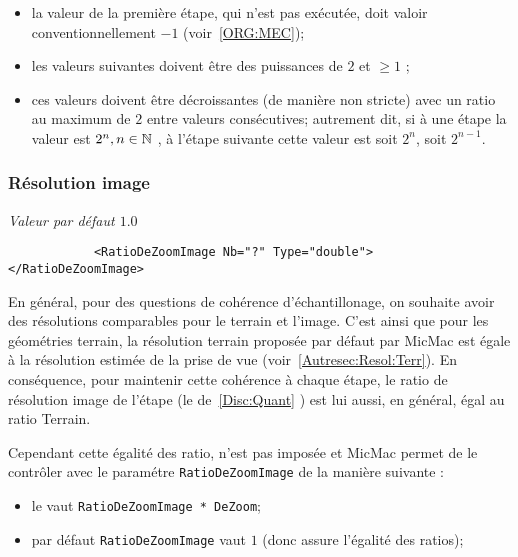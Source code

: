 \begin{itemize}
   \item  la valeur de la premi\`ere \'etape, qui n'est pas ex\'ecut\'ee,
          doit valoir conventionnellement $-1$ (voir~\ref{ORG:MEC});

   \item  les valeurs suivantes doivent \^etre des puissances de $2$
          et $\geq1$ ;

   \item  ces valeurs doivent \^etre d\'ecroissantes (de mani\`ere non
          stricte)  avec un ratio au maximum de $2$ entre valeurs
          cons\'ecutives;
          autrement  dit, si \`a une \'etape la valeur est  $2^n, n\in \NN$ ,
          \`a l'\'etape suivante cette valeur est  soit $2^n$, soit $2^{n-1}$.
\end{itemize}

\subsubsection{R\'esolution image}
\emph{Valeur par d\'efaut $1.0$}
\begin{verbatim}
            <RatioDeZoomImage Nb="?" Type="double"> </RatioDeZoomImage>
\end{verbatim}

En g\'en\'eral, pour des questions de coh\'erence d'\'echantillonage,
on souhaite avoir des r\'esolutions comparables pour 
le terrain et l'image. 
C'est ainsi que pour les g\'eom\'etries
terrain, la r\'esolution terrain propos\'ee par d\'efaut par 
MicMac est \'egale \`a la r\'esolution estim\'ee
 de la prise de vue (voir~\ref{Autresec:Resol:Terr}).
En cons\'equence,  pour maintenir cette coh\'erence \`a chaque \'etape,
le ratio de r\'esolution image  de l'\'etape 
(le \DeltaI de~\ref{Disc:Quant} ) est  lui aussi, en g\'en\'eral,
\'egal  au ratio Terrain.

Cependant cette \'egalit\'e des ratio, n'est pas impos\'ee et
MicMac permet de le contr\^oler avec le param\'etre 
{\tt RatioDeZoomImage} de la mani\`ere suivante :


\begin{itemize}
     \item le \DeltaI vaut {\tt RatioDeZoomImage * DeZoom};
     \item  par d\'efaut {\tt RatioDeZoomImage} vaut $1$
            (donc assure l'\'egalit\'e des ratios);
\end{itemize}

